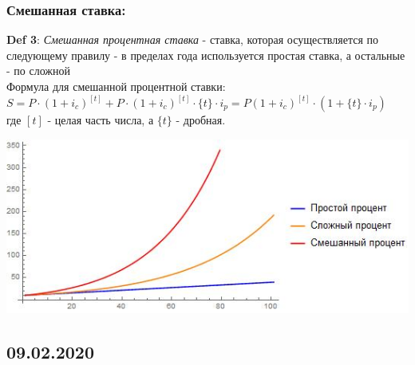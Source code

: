 \documentclass[aps,%
12pt,%
final,%
oneside,
onecolumn,%
musixtex, %
superscriptaddress,%
centertags]{article} %
\begin{document}
\subsubsection{Смешанная ставка:}

\textbf{Def 3}: \textit{Смешанная процентная ставка} - ставка, которая осуществляется по следующему правилу - в пределах года используется простая ставка, а остальные - по сложной  \\[0.3cm]
Формула для смешанной процентной ставки: \\[0.3cm]
$S = P\cdot (1+i_c)^{[t]} + P\cdot (1+i_c)^{[t]} \cdot {\{t\}}\cdot i_p = P(1+i_c)^{[t]} \cdot (1 + {\{t\}}\cdot i_p ) $ \\ [0.3cm]
где ${[t]}$ - целая часть числа, а  ${\{t\}}$ - дробная.
\begin{center}

\includegraphics[scale=0.6]{images/first.jpg}

\end{center}

\subsection{09.02.2020}
\end{document}
